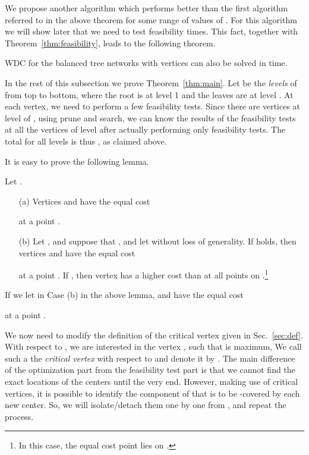 \documentclass{llncs}
\newcommand{\QED}{\hfill}
\begin{document}
{We propose another algorithm which performs better than the first algorithm
referred to in the above theorem for some range of values of .
For this algorithm we will show later that we need to test feasibility  times.
This fact, together with Theorem~\ref{thm:feasibility}, leads to the following theorem.
\begin{theorem}\label{thm:main}
WDC for the balanced tree networks with  vertices can also be solved in 
 time.
\QED
\end{theorem}

In the rest of this subsection we prove Theorem~\ref{thm:main}.
Let  be the {\em levels} of  from top to bottom,
where the root  is at level 1 and  the leaves are at level .
At each vertex, we need to perform a few feasibility tests.
Since there are  vertices at level  of ,
using prune and search, 
we can know the results of the feasibility tests at all the vertices of level 
after actually performing only  feasibility tests.
The total for all levels is thus ,
as claimed above.

It is easy to prove the following lemma.
\begin{lemma}\label{lem:eqCost}
Let .
\begin{enumerate}
\item[(a)]
{\rm \cite{kariv1979b}}
Vertices  and  have the equal cost

at a point .
\item[(b)]
Let , and
suppose that , and let  without loss of generality.
If  holds,
then vertices  and  have the equal cost

at a point . 
If ,
then vertex  has a higher cost than  at all points on .\footnote{In this case,
the equal cost point lies on .}
\QED
\end{enumerate}
\end{lemma}

If we let  in Case (b) in the above lemma,
 and  have the equal cost

at a point .

We now need to modify the definition of the critical vertex given in Sec.~\ref{sec:def}.
With respect to ,
we are interested in the vertex , 
such that  is maximum,
We call such a  the {\em critical vertex} with respect to  and denote it by .
The main difference of the optimization part from the feasibility test part
is that we cannot find the exact locations of the centers until the very end.
However, making use of critical vertices, it is possible to identify
the component of  that is to be -covered by each new center.
So, we will isolate/detach them one by one from ,
and repeat the process.

}
\end{document}
